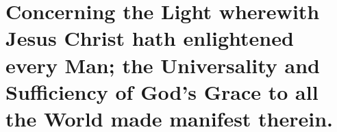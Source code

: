 \documentclass[../main.tex]{subfiles}
\begin{document}
	
	\chapter{Concerning the Light wherewith Jesus Christ hath enlightened every Man; the Universality and Sufficiency of God's Grace to all the World made manifest therein.}
	
	
	
	\theendnotes
	\setcounter{endnote}{0}        %
\end{document}
